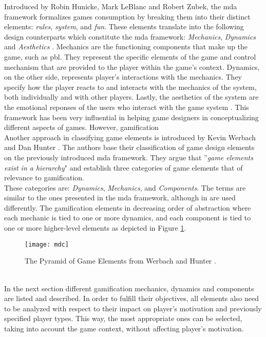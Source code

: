 Introduced by Robin Hunicke, Mark LeBlanc and Robert Zubek, the \acrshort{mda} framework formalizes games consumption by breaking them into their distinct elements: \textit{rules}, \textit{system}, and \textit{fun}. These elements translate into the following design counterparts which constitute the \acrshort{mda} framework: \textit{Mechanics}, \textit{Dynamics} and \textit{Aesthetics} \cite{hunicke2004mda}. Mechanics are the functioning components that make up the game, such as \acrshort{pbl}. They represent the specific elements of the game and control mechanism that are provided to the player within the game's context. Dynamics, on the other side, represents player's interactions with the mechanics. They specify how the player reacts to and interacts with the mechanics of the system, both individually and with other players. Lastly, the aesthetics of the system are the emotional reponses of the users who interact with the game system \cite{zichermann2011gamification}. This framework has been very influential in helping game designers in conceptualizing different aspects of games. However, gamification \\ Another approach in classifying game elements is introduced by Kevin Werbach and Dan Hunter \cite{werbach2012win}. The authors base their classification of game design elements on the previously introduced \acrshort{mda} framework. They argue that ''\textit{game elements exist in a hierarchy}" and establish three categories of game elements that of relevance to gamification. \\These categories are: \textit{Dynamics}, \textit{Mechanics}, and \textit{Components}. The terms are similar to the ones presented in the \acrshort{mda} framework, although in \cite{werbach2012win} are used differently. The gamification elements in decreasing order of abstraction where each mechanic is tied to one or more dynamics, and each component is tied to one or more higher-level elements as depicted in Figure \ref{fig:mdc}.
\begin{figure}[h]
    \centering
    \texttt{[image: mdc]}
    \caption{The Pyramid of Game Elements from Werbach and Hunter \cite{werbach2012win}.}
    \label{fig:mdc}
\end{figure}\\
In the next section different gamification mechanics, dynamics and components are listed and described. In order to fulfill their objectives, all elements also need to be analyzed with respect to their impact on player's motivation and previously specified player types. This way, the most appropriate ones can be selected, taking into account the game context, without affecting player's motivation.

